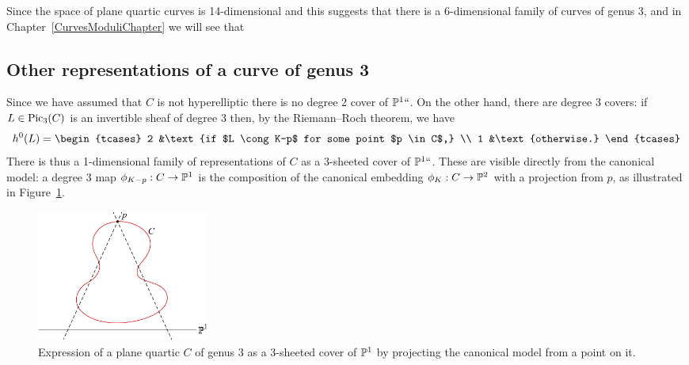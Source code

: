 Since the space of plane quartic curves is 14-dimensional and
this suggests that
there is a 6-dimensional family of curves of genus 3, and in
Chapter~\ref{CurvesModuliChapter}
we will see that

\subsection*{Other representations of a curve of genus 3}
\label{other genus 3}
Since we have assumed that $C$ is not hyperelliptic there is no degree 2
cover of ${\mathbb P}^1` `$. On the other hand, there are degree 3 covers: if $L \in
\operatorname{Pic}_3(C)$ is an invertible sheaf of degree 3 then, by the
%
Riemann--Roch theorem, we have
$$
h^0(L) =
\begin{tcases}
2 &\text{if $L \cong K-p$ for some point $p \in C$,} \\
1 &\text{otherwise.}
\end{tcases}
$$
There is thus a 1-dimensional family of representations of $C$ as a
3-sheeted cover of ${\mathbb P}^1` `$. These are  visible directly from the canonical
model: a degree 3 map $\phi_{K-p} : C \to {\mathbb P}^1$ is the composition of
the canonical embedding $\phi_K : C \to {\mathbb P}^2$ with a projection from $p$,
as illustrated in Figure~\ref{g13 on quartic}.

\begin{figure}
\includegraphics[height=1.7in,trim=0 0 15 0,clip]{main/Fig05-3}%
 \caption{Expression of a plane quartic $C$ of genus 3 as a 3-sheeted
%
 cover of ${\mathbb P}^1$ by projecting the canonical model from a point on it.}
 \label{g13 on quartic}
\end{figure}

